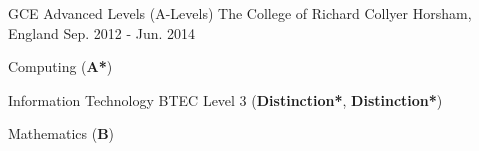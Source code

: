 \begin{cventries}
  \cventry
    {GCE Advanced Levels (A-Levels)} %
    {The College of Richard Collyer} %
    {Horsham, England} %
    {Sep. 2012 - Jun. 2014} %
    {
      \begin{cvitems} %
        \item {Computing (\textbf{A*})}
        \item {Information Technology BTEC Level 3 (\textbf{Distinction*}, \textbf{Distinction*})}
        \item {Mathematics (\textbf{B})}
      \end{cvitems}
    }
    {}

\end{cventries}

